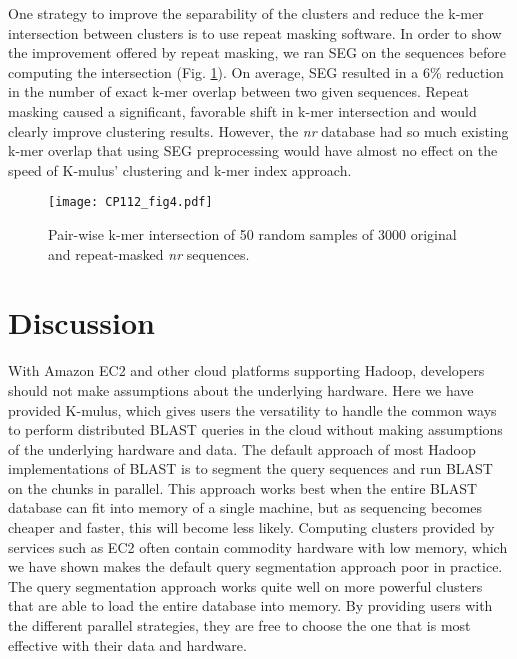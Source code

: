 One strategy to improve the separability of the clusters and reduce the k-mer intersection between clusters is to use repeat masking software.
In order to show the improvement offered by repeat masking, we ran SEG\cite{wootton1993statistics} on the sequences before computing the intersection (Fig. \ref{fig:kmer_intersection}). On average, SEG resulted in a 6\% reduction in the number of exact k-mer overlap between two given sequences. Repeat masking caused a significant, favorable shift in k-mer intersection and would clearly improve clustering results. However, the \emph{nr} database had so much existing k-mer overlap that using SEG preprocessing would have almost no effect on the speed of K-mulus' clustering and k-mer index approach.

\begin{figure}[!htb]%
\begin{center}
\texttt{[image: CP112\_fig4.pdf]}
\end{center}
\renewcommand{\baselinestretch}{1}
\small\normalsize
\begin{quote}
  \caption{Pair-wise k-mer intersection of 50 random samples of 3000 original and repeat-masked \emph{nr} sequences.}
  \label{fig:kmer_intersection}
\end{quote}
\end{figure}
\renewcommand{\baselinestretch}{2}
\small\normalsize



%
\section{Discussion}

With Amazon EC2 and other cloud platforms supporting Hadoop, developers should not make assumptions about the underlying hardware.
Here we have provided K-mulus, which gives users the versatility to handle the common ways to perform distributed BLAST queries in the cloud without making assumptions of the underlying hardware and data.
The default approach of most Hadoop implementations of BLAST is to segment the query sequences and run BLAST on the chunks in parallel.
This approach works best when the entire BLAST database can fit into memory of a single machine, but as sequencing becomes cheaper and faster, this will become less likely.
Computing clusters provided by services such as EC2 often contain commodity hardware with low memory, which we have shown makes the default query segmentation approach poor in practice.
The query segmentation approach works quite well on more powerful clusters that are able to load the entire database into memory.
By providing users with the different parallel strategies, they are free to choose the one that is most effective with their data and hardware.

